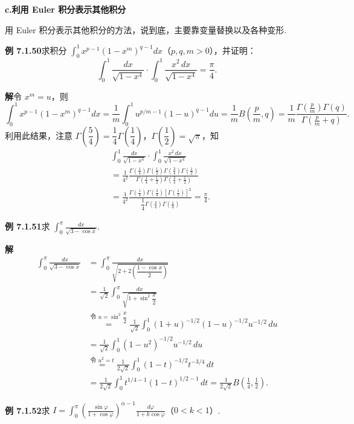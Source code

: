 \documentclass[UTF8, 12pt, fontset=fandol, oneside]{ctexart}
\begin{document}
\noindent\textbf{c.\quad 利用 Euler 积分表示其他积分}

用 Euler 积分表示其他积分的方法，说到底，主要靠变量替换以及各种变形.

\noindent\textbf{例 7.1.50}\quad 求积分 $\displaystyle\int_0^1x^{p-1}(1-x^m)^{q-1}dx$（$p,q,m>0$），并证明：
\[
\int_0^1\frac{dx}{\sqrt{1-x^4}}\cdot\int_0^1\frac{x^2\,dx}{\sqrt{1-x^4}}=\frac\pi4.
\]

\noindent\textbf{解}\quad 令 $x^m=u$，则
\[
\int_0^1x^{p-1}(1-x^m)^{q-1}dx
=\frac1m\int_0^1u^{p/m-1}(1-u)^{q-1}du
=\frac1m B\left(\frac pm,q\right)
=\frac1m\frac{\Gamma\left(\frac pm\right)\Gamma(q)}
{\Gamma\left(\frac pm+q\right)}.
\]
利用此结果，注意 $\Gamma\left(\dfrac54\right)=\dfrac14\Gamma\left(\dfrac14\right)$，$\Gamma\left(\dfrac12\right)=\sqrt\pi$，知
\[
\begin{aligned}
&\int_0^1\frac{dx}{\sqrt{1-x^4}}\cdot\int_0^1\frac{x^2\,dx}{\sqrt{1-x^4}}\\
&=\frac1{4^2}
\frac{\Gamma\left(\frac14\right)\Gamma\left(\frac12\right)
\Gamma\left(\frac34\right)\Gamma\left(\frac12\right)}
{\Gamma\left(\frac14+\frac12\right)\Gamma\left(\frac34+\frac12\right)}\\
&=\frac1{4^2}
\frac{\Gamma\left(\frac14\right)\Gamma\left(\frac34\right)
\left[\Gamma\left(\frac12\right)\right]^2}
{\dfrac14\Gamma\left(\frac34\right)\Gamma\left(\frac14\right)}
=\frac\pi4.
\end{aligned}
\]

\noindent\textbf{例 7.1.51}\quad 求 $\displaystyle\int_0^\pi\frac{dx}{\sqrt{3-\cos x}}$.

\noindent\textbf{解}\quad
\[
\begin{aligned}
\int_0^\pi\frac{dx}{\sqrt{3-\cos x}}
&=\int_0^\pi\frac{dx}{\sqrt{2+2\left(\dfrac{1-\cos x}{2}\right)}}\\
&=\frac1{\sqrt2}\int_0^\pi\frac{dx}{\sqrt{1+\sin^2\dfrac x2}}\\
&\overset{\text{令 }u=\sin^2\dfrac x2}{=}
\frac1{\sqrt2}\int_0^1(1+u)^{-1/2}(1-u)^{-1/2}u^{-1/2}\,du\\
&=\frac1{\sqrt2}\int_0^1(1-u^2)^{-1/2}u^{-1/2}\,du\\
&\overset{\text{令 }u^2=t}{=}
\frac1{2\sqrt2}\int_0^1(1-t)^{-1/2}t^{-3/4}\,dt\\
&=\frac1{2\sqrt2}\int_0^1t^{1/4-1}(1-t)^{1/2-1}\,dt
=\frac1{2\sqrt2}B\left(\frac14,\frac12\right).
\end{aligned}
\]

\noindent\textbf{例 7.1.52}\quad 求 $I=\displaystyle\int_0^\pi\left(\frac{\sin\varphi}{1+\cos\varphi}\right)^{\alpha-1}\frac{d\varphi}{1+k\cos\varphi}$（$0<k<1$）.
\end{document}
